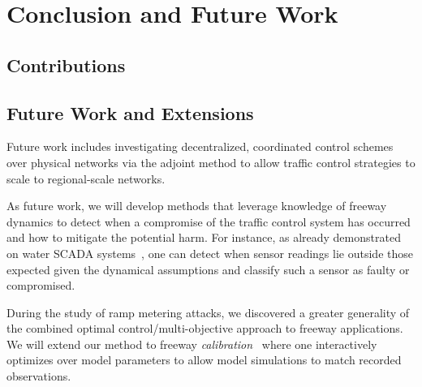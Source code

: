 \chapter{Conclusion and Future Work}
\section{Contributions}
\section{Future Work and Extensions}



Future 
work includes investigating decentralized, coordinated control schemes over physical 
networks via the adjoint method to allow traffic control strategies to scale to 
regional-scale networks.

As future work, we will develop methods that leverage knowledge of freeway dynamics to detect when a compromise of the traffic control system has occurred and how to mitigate the potential harm. For instance, as already demonstrated on water SCADA systems~\cite{amin2013cyber}, one can detect when sensor readings lie outside those expected given the dynamical assumptions and classify such a sensor as faulty or compromised.

During the study of ramp metering attacks, we discovered a greater generality of the combined optimal control/multi-objective approach to freeway applications. We will extend our method to freeway \emph{calibration}~\cite{Jacqueta} where one interactively optimizes over model parameters to allow model simulations to match recorded observations.
